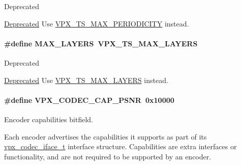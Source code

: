 \begin{DoxyRefDesc}{Deprecated}
\item[\hyperlink{deprecated__deprecated000001}{Deprecated}]Use \hyperlink{group__encoder_ga684b48cb6e47a258247637186557eb19}{V\-P\-X\-\_\-\-T\-S\-\_\-\-M\-A\-X\-\_\-\-P\-E\-R\-I\-O\-D\-I\-C\-I\-T\-Y} instead. \end{DoxyRefDesc}
\hypertarget{group__encoder_gade9d4b2ac5f29fe89ffea40e7c58c9d6}{
\paragraph[{M\-A\-X\-\_\-\-L\-A\-Y\-E\-R\-S}]{\setlength{\rightskip}{0pt plus 5cm}\#define M\-A\-X\-\_\-\-L\-A\-Y\-E\-R\-S~{\bf V\-P\-X\-\_\-\-T\-S\-\_\-\-M\-A\-X\-\_\-\-L\-A\-Y\-E\-R\-S}}}\label{group__encoder_gade9d4b2ac5f29fe89ffea40e7c58c9d6}
\begin{DoxyRefDesc}{Deprecated}
\item[\hyperlink{deprecated__deprecated000002}{Deprecated}]Use \hyperlink{group__encoder_ga2715ac3dd8bf2f5438c4bbfc82788eb2}{V\-P\-X\-\_\-\-T\-S\-\_\-\-M\-A\-X\-\_\-\-L\-A\-Y\-E\-R\-S} instead. \end{DoxyRefDesc}
\hypertarget{group__encoder_ga398803f408d6f71aae730b5ee7793e1c}{
\paragraph[{V\-P\-X\-\_\-\-C\-O\-D\-E\-C\-\_\-\-C\-A\-P\-\_\-\-P\-S\-N\-R}]{\setlength{\rightskip}{0pt plus 5cm}\#define V\-P\-X\-\_\-\-C\-O\-D\-E\-C\-\_\-\-C\-A\-P\-\_\-\-P\-S\-N\-R~0x10000}}\label{group__encoder_ga398803f408d6f71aae730b5ee7793e1c}


Encoder capabilities bitfield. 

Each encoder advertises the capabilities it supports as part of its \hyperlink{group__codec_gad654f3da60151f5dfef70aca00ef1e9e}{vpx\-\_\-codec\-\_\-iface\-\_\-t} interface structure. Capabilities are extra interfaces or functionality, and are not required to be supported by an encoder.

